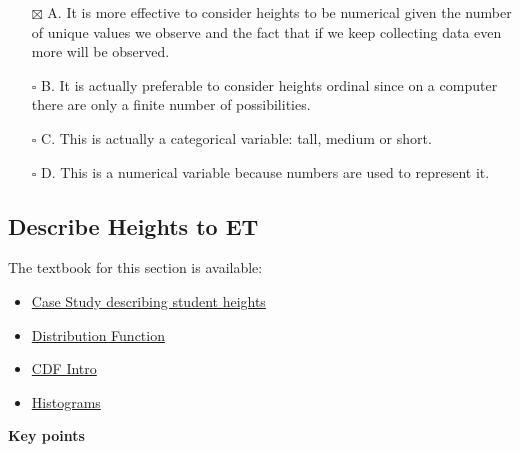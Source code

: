 \documentclass[
]{article}
\providecommand{\tightlist}{%
  \setlength{\itemsep}{0pt}\setlength{\parskip}{0pt}}
\begin{document}
\begin{itemize}
\tightlist
\item[$\boxtimes$]
  A. It is more effective to consider heights to be numerical given the
  number of unique values we observe and the fact that if we keep
  collecting data even more will be observed.
\item[$\square$]
  B. It is actually preferable to consider heights ordinal since on a
  computer there are only a finite number of possibilities.
\item[$\square$]
  C. This is actually a categorical variable: tall, medium or short.
\item[$\square$]
  D. This is a numerical variable because numbers are used to represent
  it.
\end{itemize}

\hypertarget{describe-heights-to-et}{%
\subsection{Describe Heights to ET}\label{describe-heights-to-et}}

The textbook for this section is available:

\begin{itemize}
\tightlist
\item
  \href{https://rafalab.github.io/dsbook/distributions.html\#case-study-describing-student-heights}{Case
  Study describing student heights}
\item
  \href{https://rafalab.github.io/dsbook/distributions.html\#distribution-function}{Distribution
  Function}
\item
  \href{https://rafalab.github.io/dsbook/distributions.html\#cdf-intro}{CDF
  Intro}
\item
  \href{https://rafalab.github.io/dsbook/distributions.html\#histograms}{Histograms}
\end{itemize}

\textbf{Key points}
\end{document}
